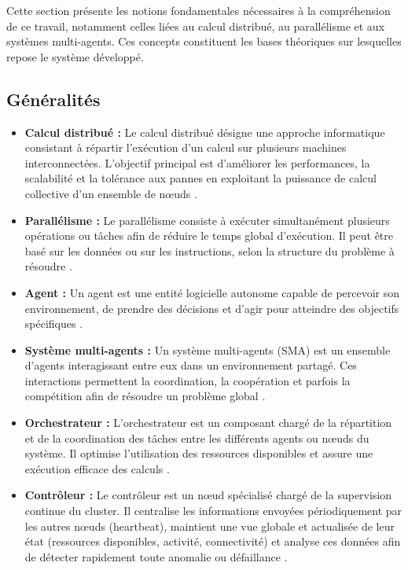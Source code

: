 \documentclass[12pt,a4paper]{report}
\theoremstyle{definition}
\begin{document}
Cette section présente les notions fondamentales nécessaires à la compréhension de ce travail, notamment celles liées au calcul distribué, au parallélisme et aux systèmes multi-agents. Ces concepts constituent les bases théoriques sur lesquelles repose le système développé.

\subsection{Généralités}

\begin{itemize}
    \item[$\bullet$] \textbf{Calcul distribué :} Le calcul distribué désigne une approche informatique consistant à répartir l’exécution d’un calcul sur plusieurs machines interconnectées. L’objectif principal est d’améliorer les performances, la scalabilité et la tolérance aux pannes en exploitant la puissance de calcul collective d’un ensemble de nœuds \cite{tanenbaum_ds}.

    \item[$\bullet$] \textbf{Parallélisme :} Le parallélisme consiste à exécuter simultanément plusieurs opérations ou tâches afin de réduire le temps global d’exécution. Il peut être basé sur les données ou sur les instructions, selon la structure du problème à résoudre \cite{tanenbaum_ds}.

    \item[$\bullet$] \textbf{Agent :} Un agent est une entité logicielle autonome capable de percevoir son environnement, de prendre des décisions et d’agir pour atteindre des objectifs spécifiques \cite{wooldridge}.

    \item[$\bullet$] \textbf{Système multi-agents :} Un système multi-agents (SMA) est un ensemble d’agents interagissant entre eux dans un environnement partagé. Ces interactions permettent la coordination, la coopération et parfois la compétition afin de résoudre un problème global \cite{wooldridge}.

    \item[$\bullet$] \textbf{Orchestrateur :} L’orchestrateur est un composant chargé de la répartition et de la coordination des tâches entre les différents agents ou nœuds du système. Il optimise l’utilisation des ressources disponibles et assure une exécution efficace des calculs \cite{tanenbaum_ds, kubernetes}.

    \item[$\bullet$] \textbf{Contrôleur :} Le contrôleur est un nœud spécialisé chargé de la supervision continue du cluster. Il centralise les informations envoyées périodiquement par les autres nœuds (heartbeat), maintient une vue globale et actualisée de leur état (ressources disponibles, activité, connectivité) et analyse ces données afin de détecter rapidement toute anomalie ou défaillance \cite{tanenbaum_ds}.


\end{itemize}
\end{document}
